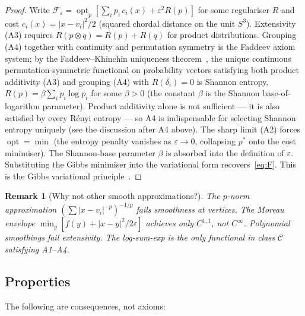 \documentclass[12pt]{article}
\newtheorem{remark}[theorem]{Remark}
\newcommand{\Fcal}{\mathcal{F}}
\begin{document}
\begin{proof}
Write $\Fcal_\varepsilon = \operatorname{opt}_p[\sum_i p_i\,c_i(x)
+ \varepsilon^2 R(p)]$ for some regulariser $R$ and cost
$c_i(x) = |x - v_i|^2/2$ (squared chordal distance on the unit $S^3$). Extensivity (A3) requires $R(p \otimes q) = R(p) + R(q)$ for product distributions. Grouping (A4) together with continuity and permutation symmetry is the Faddeev axiom system; by the Faddeev--Khinchin uniqueness theorem~\citep{Faddeev1956}, the unique continuous permutation-symmetric functional on probability vectors satisfying both product additivity (A3) and grouping (A4) with $R(\delta_i) = 0$ is Shannon entropy, $R(p) = \beta\sum_i p_i\log p_i$ for some $\beta > 0$ (the constant $\beta$ is the Shannon base-of-logarithm parameter). Product additivity alone is not sufficient --- it is also satisfied by every R\'enyi entropy --- so A4 is indispensable for selecting Shannon entropy uniquely (see the discussion after A4 above). The sharp limit (A2) forces $\operatorname{opt} = \min$
(the entropy penalty vanishes as $\varepsilon \to 0$, collapsing $p^*$
onto the cost minimiser). The Shannon-base parameter $\beta$ is absorbed into the
definition of $\varepsilon$. Substituting the Gibbs minimiser into the
variational form recovers~\eqref{eq:F}. This is the Gibbs variational
principle~\citep{ShoreJohnson1980}.
\end{proof}

\begin{remark}[Why not other smooth approximations?]
The $p$-norm approximation $(\sum |x - v_i|^{-p})^{-1/p}$ fails
smoothness at vertices. The Moreau envelope $\min_y[f(y) +
|x-y|^2/2\varepsilon]$ achieves only $C^{1,1}$, not $C^\infty$. Polynomial
smoothings fail extensivity. The log-sum-exp is the \textit{only}
functional in class $\mathcal{C}$ satisfying A1--A4.
\end{remark}

\subsection{Properties}

The following are consequences, not axioms:
\end{document}
